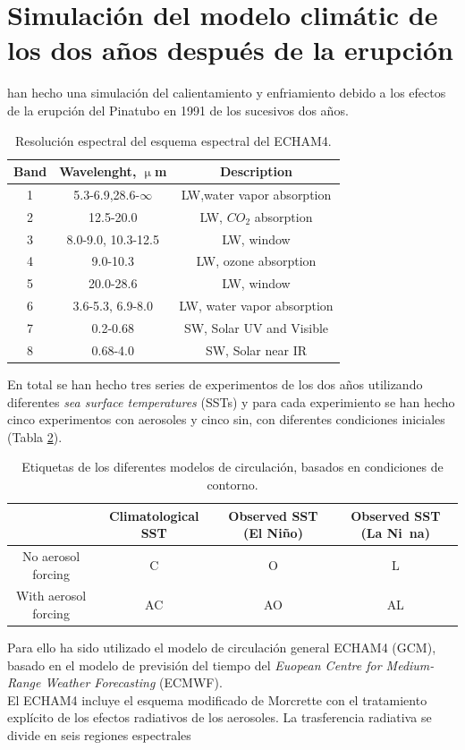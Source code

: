\documentclass[a4apaper,twocolumn,10pt]{article}
\begin{document}
\section{Simulaci\'on del modelo clim\'atic de los dos a\~nos despu\'es de la erupci\'on}
\cite{kirchner1999climate} han hecho una simulaci\'on del calientamiento y enfriamiento debido a los efectos de la erupci\'on del Pinatubo en 1991 de los sucesivos dos a\~nos. 
\begin{table}[b]
\centering
\begin{tabular}{c|c|c}
Band&Wavelenght, $\upmu$m&Description \\ \hline
1&5.3-6.9,28.6-$\infty$&LW,water vapor absorption \\
2&12.5-20.0&LW, $CO_{2}$ absorption\\
3&8.0-9.0, 10.3-12.5&LW, window \\
4&9.0-10.3&LW, ozone absorption \\
5&20.0-28.6&LW, window \\
6&3.6-5.3, 6.9-8.0&LW, water vapor absorption \\
7&0.2-0.68&SW, Solar UV and Visible \\
8&0.68-4.0&SW, Solar near IR \\ \hline
\end{tabular}
\caption{Resoluci\'on espectral del esquema espectral del ECHAM4.} \label{tlb:Tabla1}
\end{table}
En total se han hecho tres series de experimentos de los dos a\~nos utilizando diferentes \textit{sea surface temperatures} (SSTs) y para cada experimiento se han hecho cinco experimentos con aerosoles y cinco sin, con diferentes condiciones iniciales (Tabla \ref{tlb:Tabla2}).
\begin{table}[t]
\centering
\begin{tabular}{c|c|c|c}
&Climatological SST&Observed SST (El Ni\~no)&Observed SST (La Ni~na) \\ \hline
No aerosol forcing&C&O&L\\
With aerosol forcing&AC&AO&AL\\ \hline
\end{tabular}
\caption{Etiquetas de los diferentes modelos de circulaci\'on, basados en condiciones de contorno.} \label{tlb:Tabla2}
\end{table}
Para ello ha sido utilizado el modelo de circulaci\'on general ECHAM4 (GCM), basado en el modelo de previsi\'on del tiempo del \textit{Euopean Centre for Medium-Range Weather Forecasting} (ECMWF). \\El ECHAM4 incluye el esquema modificado de Morcrette con el tratamiento expl\'icito de los efectos radiativos de los aerosoles. La trasferencia radiativa se divide en seis regiones espectrales 
\end{document}
